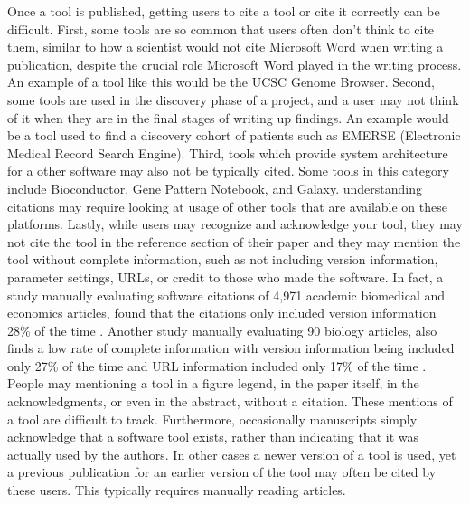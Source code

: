 \documentclass{article}
\begin{document}
Once a tool is published, getting users to cite a tool or cite it correctly can be difficult. First, some tools are so common that users often don't think to cite them, similar to how a scientist would not cite Microsoft Word when writing a publication, despite the crucial role Microsoft Word played in the writing process. An example of a tool like this would be the UCSC Genome Browser. Second, some tools are used in the discovery phase of a project, and a user may not think of it when they are in the final stages of writing up findings. An example would be a tool used to find a discovery cohort of patients such as EMERSE (Electronic Medical Record Search Engine). Third, tools which provide system architecture for a other software may also not be typically cited. Some tools in this category include Bioconductor, Gene Pattern Notebook, and Galaxy. understanding citations may require looking at usage of other tools that are available on these platforms. Lastly, while users may recognize and acknowledge your tool, they may not cite the tool in the reference section of their paper and they may mention the tool without complete information, such as not including version information, parameter settings, URLs, or credit to those who made the software.  In fact, a study manually evaluating software citations of 4,971 academic biomedical and economics articles, found that the citations only included version information  28\% of the time \cite{howison_software_2016}.  Another study manually evaluating 90 biology articles, also finds a low rate of complete information with version information being included only 27\% of the time and URL information included only 17\% of the time \cite{du_softcite_2021}. People may  mentioning a tool in a figure legend, in the paper itself, in the acknowledgments, or even in the abstract, without a citation. These mentions of a tool are difficult to track. Furthermore, occasionally manuscripts simply acknowledge that a software tool exists, rather than indicating that it was actually used by the authors. In other cases a newer version of a tool is used, yet a previous publication for an earlier version of the tool may often be cited by these users. This typically requires manually reading articles. 
\end{document}
